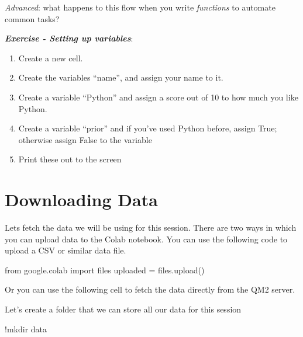 \documentclass[
  letterpaper,
  DIV=11,
  numbers=noendperiod]{scrreprt}
\newenvironment{Shaded}{\begin{snugshade}}{\end{snugshade}}
\newcommand{\ImportTok}[1]{\textcolor[rgb]{0.00,0.46,0.62}{#1}}
\newcommand{\NormalTok}[1]{\textcolor[rgb]{0.00,0.23,0.31}{#1}}
\newcommand{\OperatorTok}[1]{\textcolor[rgb]{0.37,0.37,0.37}{#1}}
\begin{document}
\emph{Advanced}: what happens to this flow when you write
\emph{functions} to automate common tasks?

\textbf{\emph{Exercise - Setting up variables}}:

\begin{enumerate}
\def\labelenumi{\arabic{enumi}.}
\item
  Create a new cell.
\item
  Create the variables ``name'', and assign your name to it.
\item
  Create a variable ``Python'' and assign a score out of 10 to how much
  you like Python.
\item
  Create a variable ``prior'' and if you've used Python before, assign
  True; otherwise assign False to the variable
\item
  Print these out to the screen
\end{enumerate}

\hypertarget{downloading-data}{%
\section{Downloading Data}\label{downloading-data}}

Lets fetch the data we will be using for this session. There are two
ways in which you can upload data to the Colab notebook. You can use the
following code to upload a CSV or similar data file.

\begin{Shaded}
\begin{Highlighting}[]
\ImportTok{from}\NormalTok{ google.colab }\ImportTok{import}\NormalTok{ files}
\NormalTok{uploaded }\OperatorTok{=}\NormalTok{ files.upload()}
\end{Highlighting}
\end{Shaded}

Or you can use the following cell to fetch the data directly from the
QM2 server.

Let's create a folder that we can store all our data for this session

\begin{Shaded}
\begin{Highlighting}[]
\OperatorTok{!}\NormalTok{mkdir data}
\end{Highlighting}
\end{Shaded}
\end{document}
